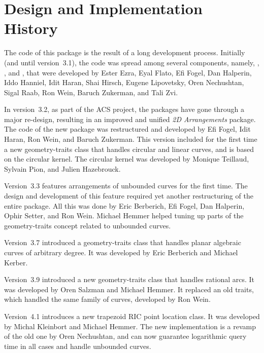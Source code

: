 \section*{Design and Implementation History}

The code of this package is the result of a long development process.
Initially (and until version~3.1), the code was spread among several
components, namely, , ,
 and , that were
developed by Ester Ezra, Eyal Flato, Efi Fogel, Dan Halperin, Iddo
Hanniel, Idit Haran, Shai Hirsch, Eugene Lipovetsky, Oren Nechushtan,
Sigal Raab, Ron Wein, Baruch Zukerman, and Tali Zvi.

In version~3.2, as part of the ACS project, the packages have gone
through a major re-design, resulting in an improved and unified
\emph{2D Arrangements} package.
The code of the new package was restructured and developed by
Efi Fogel, Idit Haran, Ron Wein, and Baruch Zukerman. This
version included for the first time a new geometry-traits
class that handles circular and linear curves, and is based
on the circular kernel. The circular kernel was developed
by Monique Teillaud, Sylvain Pion, and Julien Hazebrouck.

Version~3.3 features arrangements of unbounded curves for the first
time. The design and development of this feature required yet another
restructuring of the entire package. All this was done by Eric
Berberich, Efi Fogel, Dan Halperin, Ophir Setter, and Ron
Wein. Michael Hemmer helped tuning up parts of the geometry-traits 
concept related to unbounded curves.

Version~3.7 introduced a geometry-traits class
that handles planar algebraic curves of arbitrary degree.
It was developed by Eric Berberich and Michael Kerber.

Version~3.9 introduced a new geometry-traits class that handles
rational arcs. It was developed by Oren Salzman and Michael Hemmer.
It replaced an old traits, which handled the same family of
curves, developed by Ron Wein.

Version~4.1 introduces a new trapezoid RIC point location class.
It was developed by Michal Kleinbort and Michael Hemmer.
The new implementation is a revamp of the old one 
by Oren Nechushtan, and can now guarantee logarithmic query time
in all cases and handle unbounded curves.